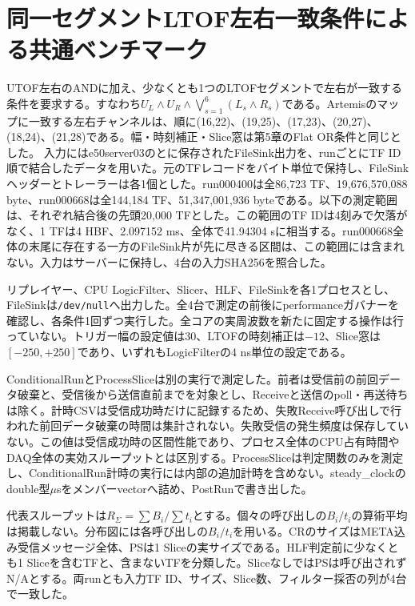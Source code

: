 \section{同一セグメントLTOF左右一致条件による共通ベンチマーク}
\label{sec:appendix-physical-lr}
UTOF左右のANDに加え、少なくとも1つのLTOFセグメントで左右が一致する条件を要求する。すなわち$U_L\land U_R\land\bigvee_{s=1}^{6}(L_s\land R_s)$である。Artemisのマップに一致する左右チャンネルは、順に(16,22)、(19,25)、(17,23)、(20,27)、(18,24)、(21,28)である。幅・時刻補正・Slice窓は第5章のFlat OR条件と同じとした。
入力にはe50server03のとに保存されたFileSink出力を、runごとにTF ID順で結合したデータを用いた。元のTFレコードをバイト単位で保持し、FileSinkヘッダーとトレーラーは各1個とした。run000400は全86,723 TF、19,676,570,088 byte、run000668は全144,184 TF、51,347,001,936 byteである。以下の測定範囲は、それぞれ結合後の先頭20,000 TFとした。この範囲のTF IDは4刻みで欠落がなく、1 TFは4 HBF、2.097152 ms、全体で41.94304 sに相当する。run000668全体の末尾に存在する一方のFileSink片が先に尽きる区間は、この範囲には含まれない。入力はサーバーに保持し、4台の入力SHA256を照合した。

リプレイヤー、CPU LogicFilter、Slicer、HLF、FileSinkを各1プロセスとし、FileSinkは\texttt{/dev/null}へ出力した。全4台で測定の前後にperformanceガバナーを確認し、各条件1回ずつ実行した。全コアの実周波数を新たに固定する操作は行っていない。トリガー幅の設定値は30、LTOFの時刻補正は$-12$、Slice窓は$[-250,+250]$であり、いずれもLogicFilterの4 ns単位の設定である。

ConditionalRunとProcessSliceは別の実行で測定した。前者は受信前の前回データ破棄と、受信後から送信直前までを対象とし、Receiveと送信のpoll・再送待ちは除く。計時CSVは受信成功時だけに記録するため、失敗Receive呼び出しで行われた前回データ破棄の時間は集計されない。失敗受信の発生頻度は保存していない。この値は受信成功時の区間性能であり、プロセス全体のCPU占有時間やDAQ全体の実効スループットとは区別する。ProcessSliceは判定関数のみを測定し、ConditionalRun計時の実行には内部の追加計時を含めない。steady\_clockのdouble型$\mu$sをメンバーvectorへ詰め、PostRunで書き出した。

代表スループットは$R_\Sigma=\sum B_i/\sum t_i$とする。個々の呼び出しの$B_i/t_i$の算術平均は掲載しない。分布図には各呼び出しの$B_i/t_i$を用いる。CRのサイズはMETA込み受信メッセージ全体、PSは1 Sliceの実サイズである。HLF判定前に少なくとも1 Sliceを含むTFと、含まないTFを分類した。SliceなしではPSは呼び出されずN/Aとする。両runとも入力TF ID、サイズ、Slice数、フィルター採否の列が4台で一致した。

